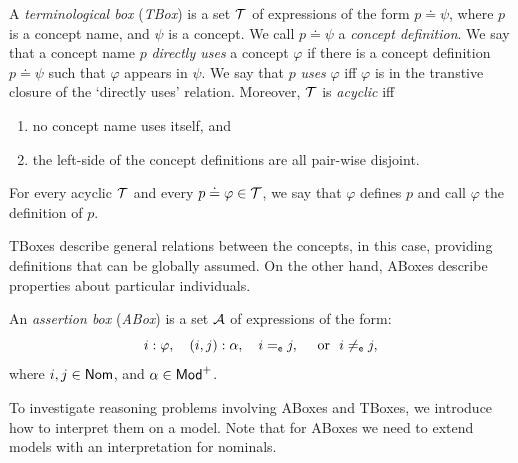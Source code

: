 \begin{definition}\label{def:xp:tbox}
    A \emph{terminological box} (\emph{TBox}) is a set $\mathcal{T}$ of expressions of the form $p \doteq \psi$, where $p$ is a concept name, and $\psi$ is a concept.
    We call $p \doteq \psi$ a \emph{concept definition}.
    We say that a concept name $p$ \emph{directly uses} a concept $\varphi$ if there is a concept definition $p \doteq \psi$ such that $\varphi$ appears in $\psi$.
    We say that $p$ \emph{uses} $\varphi$ iff $\varphi$ is in the transtive closure of the `directly uses' relation. 
    Moreover, $\mathcal{T}$ is \emph{acyclic} iff
    \begin{enumerate}
        \item no concept name uses itself, and
        \item the left-side of the concept definitions are all pair-wise disjoint.
    \end{enumerate}
    For every acyclic $\mathcal{T}$ and every ${p \doteq \varphi} \in \mathcal{T}$, we say that $\varphi$ defines $p$ and call $\varphi$ the definition of $p$.
\end{definition}

TBoxes describe general relations between the concepts, in this case, providing definitions that can be globally assumed. On the other hand, ABoxes describe properties about particular individuals. 

\begin{definition}\label{def:xp:abox}
    An \emph{assertion box} (\emph{ABox}) is a set $\mathcal{A}$ of expressions of the form:
    \[ 
        i:\varphi, \quad (i,j):\alpha, \quad i=_{\mathsf{e}} j, \quad \text{ or } \  i\neq_{\mathsf{e}} j,
    \]
    where $i,j\in\mathsf{Nom}$, and $\alpha\in\mathsf{Mod}^+$.
\end{definition}

To investigate reasoning problems involving ABoxes and TBoxes, we introduce how to interpret them on a model. Note that for ABoxes we need to extend models with an interpretation for nominals.


